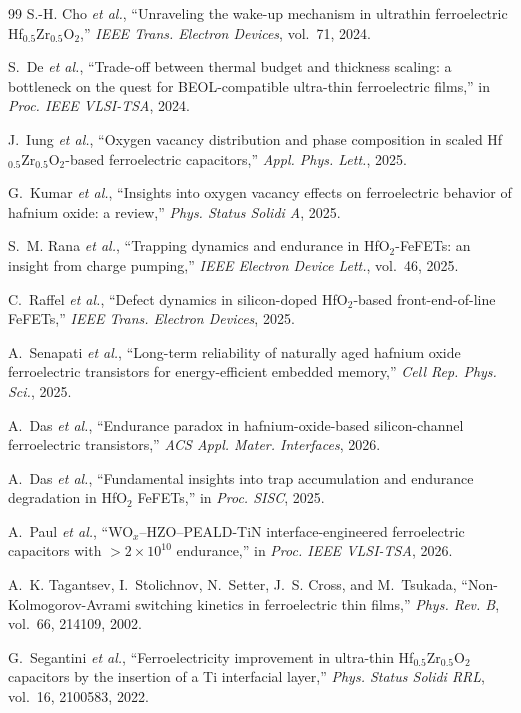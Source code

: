 \documentclass[journal]{IEEEtran}
\newcommand{\hzo}{Hf$_{0.5}$Zr$_{0.5}$O$_{2}$}
\begin{document}
\begin{thebibliography}{99}
S.-H. Cho \emph{et al.},
``Unraveling the wake-up mechanism in ultrathin ferroelectric \hzo{},''
\emph{IEEE Trans. Electron Devices}, vol.~71, 2024.

S.~De \emph{et al.},
``Trade-off between thermal budget and thickness scaling: a bottleneck on the
quest for BEOL-compatible ultra-thin ferroelectric films,''
in \emph{Proc. IEEE VLSI-TSA}, 2024.

J.~Iung \emph{et al.},
``Oxygen vacancy distribution and phase composition in scaled \hzo{}-based
ferroelectric capacitors,'' \emph{Appl. Phys. Lett.}, 2025.

G.~Kumar \emph{et al.},
``Insights into oxygen vacancy effects on ferroelectric behavior of hafnium
oxide: a review,'' \emph{Phys. Status Solidi A}, 2025.

S.~M. Rana \emph{et al.},
``Trapping dynamics and endurance in HfO$_2$-FeFETs: an insight from charge
pumping,'' \emph{IEEE Electron Device Lett.}, vol.~46, 2025.

C.~Raffel \emph{et al.},
``Defect dynamics in silicon-doped HfO$_2$-based front-end-of-line FeFETs,''
\emph{IEEE Trans. Electron Devices}, 2025.

A.~Senapati \emph{et al.},
``Long-term reliability of naturally aged hafnium oxide ferroelectric
transistors for energy-efficient embedded memory,''
\emph{Cell Rep. Phys. Sci.}, 2025.

A.~Das \emph{et al.},
``Endurance paradox in hafnium-oxide-based silicon-channel ferroelectric
transistors,'' \emph{ACS Appl. Mater. Interfaces}, 2026.

A.~Das \emph{et al.},
``Fundamental insights into trap accumulation and endurance degradation in
HfO$_2$ FeFETs,'' in \emph{Proc. SISC}, 2025.

A.~Paul \emph{et al.},
``WO$_x$--HZO--PEALD-TiN interface-engineered ferroelectric capacitors with
$>2\times10^{10}$ endurance,'' in \emph{Proc. IEEE VLSI-TSA}, 2026.

A.~K. Tagantsev, I.~Stolichnov, N.~Setter, J.~S. Cross, and M.~Tsukada,
``Non-Kolmogorov-Avrami switching kinetics in ferroelectric thin films,''
\emph{Phys. Rev. B}, vol.~66, 214109, 2002.

G.~Segantini \emph{et al.},
``Ferroelectricity improvement in ultra-thin \hzo{} capacitors by the
insertion of a Ti interfacial layer,''
\emph{Phys. Status Solidi RRL}, vol.~16, 2100583, 2022.


\end{thebibliography}
\end{document}
